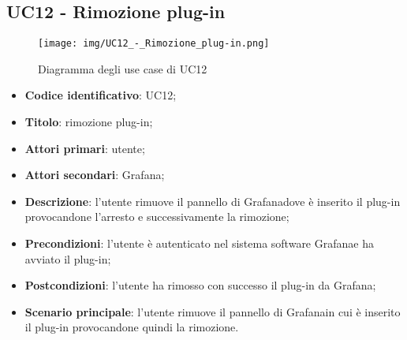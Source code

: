 \subsection{UC12 - Rimozione plug-in}
\begin{figure}[H]
\texttt{[image: img/UC12\_-\_Rimozione\_plug-in.png]}
\caption{Diagramma degli use case di UC12}
\end{figure}
\begin{itemize}
    \item \textbf{Codice identificativo}: UC12;
    \item \textbf{Titolo}: rimozione plug-in;
    \item \textbf{Attori primari}: utente;
    \item \textbf{Attori secondari}: Grafana\glo;
    \item \textbf{Descrizione}: l'utente rimuove il pannello di Grafana\glosp dove è inserito il plug-in provocandone l'arresto e successivamente la rimozione;
    \item \textbf{Precondizioni}: l'utente è autenticato nel sistema software Grafana\glosp e ha avviato il plug-in;
    \item \textbf{Postcondizioni}: l'utente ha rimosso con successo il plug-in da Grafana\glo;
    \item \textbf{Scenario principale}: l'utente rimuove il pannello di Grafana\glosp in cui è inserito il plug-in provocandone quindi la rimozione.
\end{itemize}